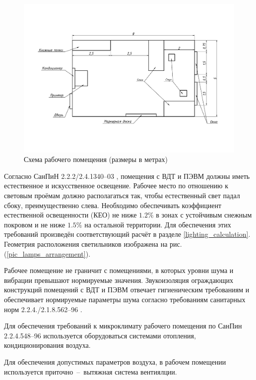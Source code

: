 \begin{figure}[ht!]
    \centering
    \includegraphics[width=\textwidth, keepaspectratio, clip=true, trim=0mm 35mm 0mm 35mm]
                    {./src/ecology/pictures/workroom_scheme}
    \caption{Схема рабочего помещения (размеры в метрах)}
    \label{pic_workroom_scheme}
\end{figure}

Согласно СанПиН 2.2.2/2.4.1340--03 \cite{ecology_sanpin_1340_03}, помещения с ВДТ
и ПЭВМ должны иметь естественное и искусственное освещение. Рабочее место по
отношению к световым проёмам должно располагаться так, чтобы естественный свет
падал сбоку, преимущественно слева. Необходимо обеспечивать коэффициент
естественной освещенности (КЕО) не ниже $1.2 \%$ в зонах с устойчивым снежным
покровом и не ниже $1.5 \%$ на остальной территории.
Для обеспечения этих требований произведён соответствующий расчёт в разделе
\ref{lighting_calculation}. Геометрия расположения светильников изображена на рис.
(\ref{pic_lamps_arrangement}).

Рабочее помещение не граничит с помещениями, в которых уровни шума и вибрации превышают
нормируемые значения. Звукоизоляция ограждающих конструкций помещений с ВДТ и ПЭВМ
отвечает гигиеническим требованиям и обеспечивает нормируемые параметры шума
согласно требованиям санитарных норм 2.2.4./2.1.8.562--96 \cite{ecology_sanitary_norm_562_96}.

Для обеспечения требований к микроклимату рабочего помещения по СанПин 2.2.4.548--96
\cite{ecology_sanpin_548_96} используется оборудоваться системами отопления,
кондиционирования воздуха.

Для обеспечения допустимых параметров воздуха, в рабочем помещении используется
приточно~--~вытяжная система вентиялции.

